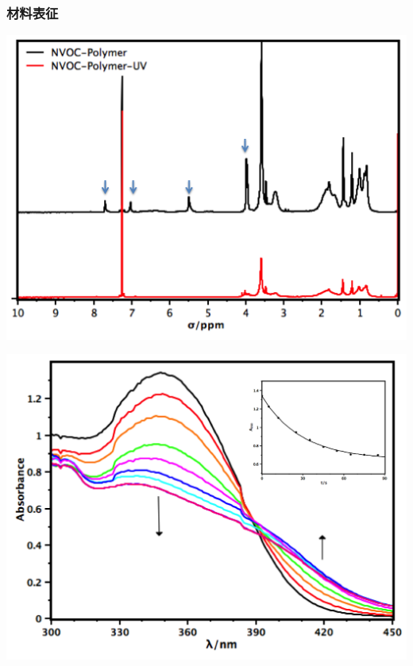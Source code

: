\documentclass{beamer}
\begin{document}
\begin{frame}
  \frametitle{材料表征}
  \begin{minipage}{0.48\textwidth}
    \includegraphics[width=\linewidth]{figures/UV-NMR.png}
  \end{minipage}
  \hfill
  \begin{minipage}{0.48\textwidth}
    \includegraphics[width=\linewidth]{figures/UV-ABS.png}
  \end{minipage}
\end{frame}
\end{document}
